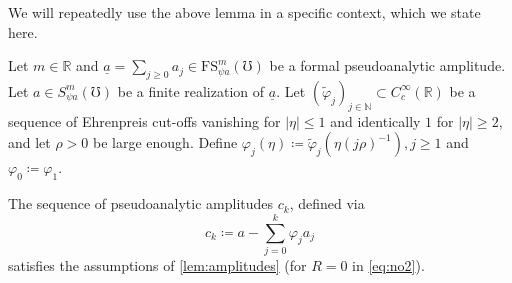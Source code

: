 \documentclass[
	fontsize=11pt, 
	twoside=false, 
	abstract=true, 
	a4paper,
]{scrartcl}
\newcommand{\eps}{\varepsilon}
\newcommand{\sem}{\setminus\{0\}}
\newcommand{\RR}{\mathbb{R}}
\newcommand{\CC}{\mathbb{C}}
\newcommand{\abs}[1]{\left\lvert#1\right\rvert}
\newcommand{\td}[1]{\tilde{#1}}
\newcommand{\ud}[1]{\underline{#1}}
\begin{document}
We will repeatedly use the above lemma in a specific context, which we state here.
\begin{lemma}\label{lem:finreaamp}
	Let $m\in \RR$ and $\ud{a} = \sum_{j\geq 0} a_j \in \mathrm{FS}^m_{\psi a}(\mho)$ be a formal pseudoanalytic amplitude. Let $a \in S^m_{\psi a}(\mho)$ be a finite realization of $\ud{a}$. Let $(\td{\varphi}_j)_{j\in\mathbb{N}} \subset C_c^\infty(\RR)$ be a sequence of Ehrenpreis cut-offs vanishing for $\abs{\eta}\leq 1$ and identically $1$ for $\abs{\eta}\geq 2$, and let $\rho > 0$ be large enough. Define $\varphi_j(\eta) \coloneqq \td{\varphi}_j(\eta (j\rho)^{-1}), j\geq 1$ and $\varphi_0 \coloneqq \varphi_1$. 

	The sequence of pseudoanalytic amplitudes $c_k$, defined via
	\[
		c_k \coloneqq  a - \sum_{j=0}^k \varphi_j a_j
	\]
	satisfies the assumptions of \cref{lem:amplitudes} (for $R = 0$ in \cref{eq:no2}).
\end{lemma}
\end{document}
